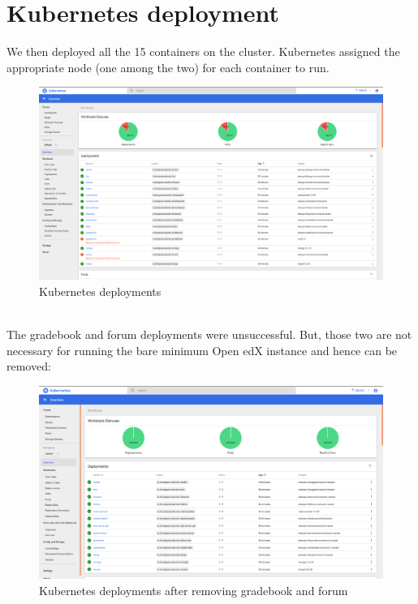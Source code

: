 \documentclass[12pt]{report}
\begin{document}
\section{Kubernetes deployment}
We then deployed all the 15 containers on the cluster. Kubernetes assigned the appropriate node (one among the two) for each container to run.
\begin{figure}[h!]
	\begin{center}
		\includegraphics[totalheight=0.34\textheight]{fgcrash}
		\caption{Kubernetes deployments}
	\end{center}
\end{figure}
\\The gradebook and forum deployments were unsuccessful. But, those two are not necessary for running the bare minimum Open edX instance and hence can be removed:
\begin{figure}[h!]
	\begin{center}
		\includegraphics[totalheight=0.34\textheight]{dep100}
		\caption{Kubernetes deployments after removing gradebook and forum}
	\end{center}
\end{figure}
\end{document}
